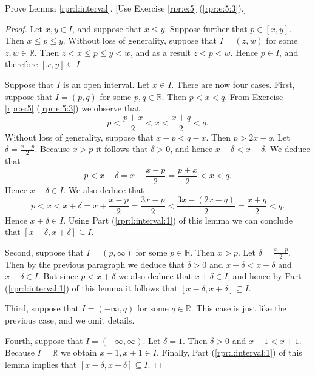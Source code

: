 \Newpage
\begin{exercise} %
	\label{rpr:e:6}
	Prove Lemma \ref{rpr:l:interval}. \hfill [Use Exercise \ref{rpr:e:5} (\ref{rpr:e:5:3}).]
\end{exercise}

\begin{proof}
	\hfill

	Let $x, y \in I$, and suppose that $x \leq y$. Suppose further that $p \in [x, y]$. Then $x \leq p \leq y$. Without loss of generality, suppose that $I = (z, w)$ for some $z, w \in \mathbb{R}$. Then $z < x \leq p \leq y < w$, and as a result $z < p < w$. Hence $p \in I$, and therefore $[x, y] \subseteq I$.

	Suppose that $I$ is an open interval. Let $x \in I$. There are now four cases. First, suppose that $I = (p, q)$ for some $p, q \in \mathbb{R}$. Then $p < x < q$. From Exercise \ref{rpr:e:5} (\ref{rpr:e:5:3}) we observe that
	$$
		p < \frac{p + x}{2} < x < \frac{x + q}{2} < q.
	$$
	Without loss of generality, suppose that $x - p < q - x$. Then $p > 2x - q$. Let $\delta = \frac{x - p}{2}$. Because $x > p$ it follows that $\delta > 0$, and hence $x - \delta < x + \delta$. We deduce that
	$$
		p < x - \delta = x - \frac{x - p}{2} = \frac{p + x}{2} < x < q.
	$$
	Hence $x - \delta \in I$. We also deduce that
	$$
		p < x < x + \delta = x + \frac{x - p}{2} = \frac{3x - p}{2} < \frac{3x - (2x - q)}{2} = \frac{x + q}{2} < q.
	$$
	Hence $x + \delta \in I$. Using Part (\ref{rpr:l:interval:1}) of this lemma we can conclude that $[x - \delta, x + \delta] \subseteq I$.

	Second, suppose that $I = (p, \infty)$ for some $p \in \mathbb{R}$. Then $x > p$. Let $\delta = \frac{x - p}{2}$. Then by the previous paragraph we deduce that $\delta > 0$ and $x - \delta < x + \delta$ and $x - \delta \in I$. But since $p < x + \delta$ we also deduce that $x + \delta \in I$, and hence by Part (\ref{rpr:l:interval:1}) of this lemma it follows that $[x - \delta, x + \delta] \subseteq I$.

	Third, suppose that $I = (-\infty, q)$ for some $q \in \mathbb{R}$. This case is just like the previous case, and we omit details.

	Fourth, suppose that $I = (-\infty, \infty)$. Let $\delta = 1$. Then $\delta > 0$ and $x - 1 < x + 1$. Because $I = \mathbb{R}$ we obtain $x - 1, x + 1 \in I$. Finally, Part (\ref{rpr:l:interval:1}) of this lemma implies that $[x - \delta, x + \delta] \subseteq I$.
\end{proof}


